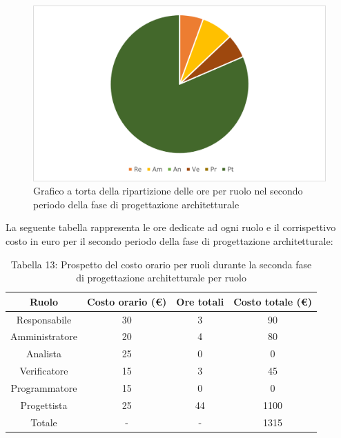 \begin{figure}[H]
    \centering
    \includegraphics[scale=0.6]{img/grafi preventivo/torta/architetturale/periodo2.png}
    \caption{Grafico a torta della ripartizione delle ore per ruolo nel secondo periodo della fase di progettazione architetturale}
\end{figure}
La seguente tabella rappresenta le ore dedicate ad ogni ruolo e il corrispettivo costo in euro per il secondo periodo della fase di progettazione architetturale:
\begin{table}[h]
	\setlength\extrarowheight{5pt}
	\centering
	\begin{tabularx}{\textwidth}{|ccc|c|}
		\hline
		\rowcolor{white}
		\textbf{Ruolo} & \textbf{Costo orario (€)} & \textbf{Ore totali} & \textbf{Costo totale (€)} \\
		\hline
		Responsabile &30&3&90 \\
		Amministratore &20&4&80 \\
		Analista &25&0&0 \\
		Verificatore &15&3&45 \\
		Programmatore &15&0&0 \\
		Progettista &25&44&1100 \\
		\hline
		Totale &-&-&1315 \\
		\hline
	\end{tabularx}
    \vspace{10pt}
	\caption{Tabella 13: Prospetto del costo orario per ruoli durante la seconda fase di progettazione architetturale per ruolo}
\end{table}

